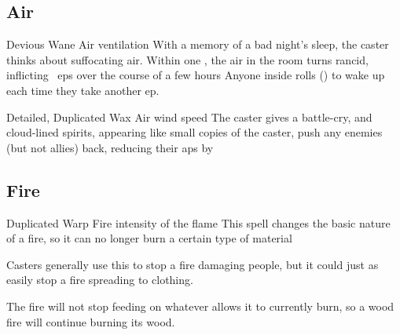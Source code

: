 \begin{multicols}{2}

\subsection{Air}
\label{airSpells}


\setcounter{diceNo}{0}%



  {Devious}%
  {Wane}%
  {Air}%
  {ventilation}%
  {With a memory of a bad night's sleep, the caster thinks about suffocating air.
  Within one \showOnset, the air in the room turns rancid, inflicting ~\glspl{ep} over the course of a few hours}%
  {Anyone inside rolls  (\tn[10]) to wake up each time they take another \gls{ep}.}



  {Detailed, Duplicated}%
  {Wax}%
  {Air}%
  {wind speed}%
  {The caster gives a battle-cry, and cloud-lined spirits, appearing like small copies of the caster, push any enemies (but not allies) back, reducing their \glspl{ap} by }%
  {}



\subsection{Fire}
\label{fireSpells}



  {Duplicated}%
  {Warp}%
  {Fire}%
  {intensity of the flame}%
  {This spell changes the basic nature of a fire, so it can no longer burn a certain type of material}%
  {Casters generally use this to stop a fire damaging people, but it could just as easily stop a fire spreading to clothing.

    The fire will not stop feeding on whatever allows it to currently burn, so a wood fire will continue burning its wood.}


\end{multicols}
